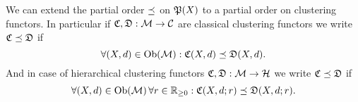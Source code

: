 \begin{myremark}{}{}
We can extend the partial order $\refines$ on $\P(X)$ to a partial order on clustering functors.
In particular if $\Cf, \mathfrak{D}: \M \to \C$ are classical clustering functors we write $\Cf \refines \mathfrak{D}$ if
\begin{equation*}
    \forall (X,d) \in \ob(\M): \Cf(X,d) \refines \mathfrak{D}(X,d).
\end{equation*}
And in case of hierarchical clustering functors $\Cf, \mathfrak{D}: \M \to \H$ we write $\Cf \refines \mathfrak{D}$ if
\begin{equation*}
    \forall (X,d) \in \ob(\M) \, \forall r \in \R_{\geq0}: \Cf(X,d;r) \refines \mathfrak{D}(X,d;r).
\end{equation*}
\end{myremark}